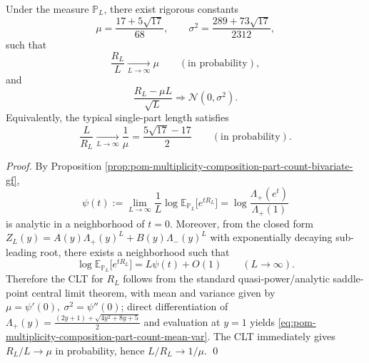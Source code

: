 \begin{theorem}\label{thm:pom-multiplicity-composition-part-count-clt}
Under the measure \(\mathbb{P}_L\), there exist rigorous constants
\begin{equation}\label{eq:pom-multiplicity-composition-part-count-mean-var}
\mu=\frac{17+5\sqrt{17}}{68},
\qquad
\sigma^2=\frac{289+73\sqrt{17}}{2312},
\end{equation}
such that
\[
\frac{R_L}{L}\xrightarrow[L\to\infty]{}\mu
\qquad(\text{in probability}),
\]
and
\[
\frac{R_L-\mu L}{\sqrt{L}}\Longrightarrow \mathcal{N}(0,\sigma^2).
\]
Equivalently, the typical single-part length satisfies
\[
\frac{L}{R_L}\xrightarrow[L\to\infty]{}\frac{1}{\mu}=\frac{5\sqrt{17}-17}{2}
\qquad(\text{in probability}).
\]
\end{theorem}
\begin{proof}
By Proposition \ref{prop:pom-multiplicity-composition-part-count-bivariate-gf},
\[
\psi(t)
:=\lim_{L\to\infty}\frac1L\log \mathbb{E}_{\mathbb{P}_L}\!\bigl[e^{tR_L}\bigr]
=\log\frac{\Lambda_+(e^{t})}{\Lambda_+(1)}
\]
is analytic in a neighborhood of \(t=0\).
Moreover, from the closed form
\(
Z_L(y)=A(y)\Lambda_+(y)^L+B(y)\Lambda_-(y)^L
\)
with exponentially decaying sub-leading root, there exists a neighborhood such that
\[
\log \mathbb{E}_{\mathbb{P}_L}\!\bigl[e^{tR_L}\bigr]
=L\psi(t)+O(1)\qquad(L\to\infty).
\]
Therefore the CLT for \(R_L\) follows from the standard quasi-power/analytic saddle-point central limit theorem,
with mean and variance given by
\(
\mu=\psi'(0),\ \sigma^2=\psi''(0)
\);
direct differentiation of
\(
\Lambda_+(y)=\frac{(2y+1)+\sqrt{4y^2+8y+5}}{2}
\)
and evaluation at \(y=1\) yields \eqref{eq:pom-multiplicity-composition-part-count-mean-var}.
The CLT immediately gives \(R_L/L\to\mu\) in probability, hence \(L/R_L\to 1/\mu\). \qed
\end{proof}

